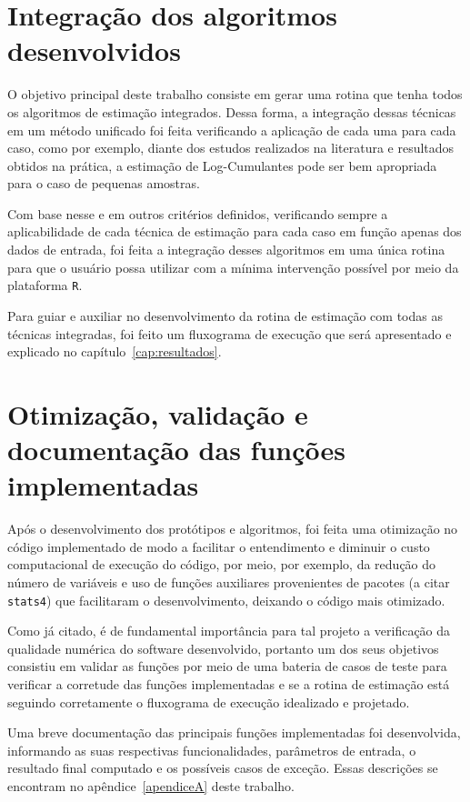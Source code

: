 \section{Integração dos algoritmos desenvolvidos}

O objetivo principal deste trabalho consiste em gerar uma rotina que tenha todos os algoritmos de estimação integrados. Dessa forma, a integração dessas técnicas em um método unificado foi feita verificando a aplicação de cada uma para cada caso, como por exemplo, diante dos estudos realizados na literatura e resultados obtidos na prática, a estimação de Log-Cumulantes pode ser bem apropriada para o caso de pequenas amostras.

Com base nesse e em outros critérios definidos, verificando sempre a aplicabilidade de cada técnica de estimação para cada caso em função apenas dos dados de entrada, foi feita a integração desses algoritmos em uma única rotina para que o usuário possa utilizar com a mínima intervenção possível por meio da plataforma \texttt{R}.

Para guiar e auxiliar no desenvolvimento da rotina de estimação com todas as técnicas integradas, foi feito um fluxograma de execução que será apresentado e explicado no capítulo~\ref{cap:resultados}.


\section{Otimização, validação e documentação das funções implementadas}

Após o desenvolvimento dos protótipos e algoritmos, foi feita uma otimização no código implementado de modo a facilitar o entendimento e diminuir o custo computacional de execução do código, por meio, por exemplo, da redução do número de variáveis e uso de funções auxiliares provenientes de pacotes (a citar \texttt{stats4}) que facilitaram o desenvolvimento, deixando o código mais otimizado.

Como já citado, é de fundamental importância para tal projeto a verificação da qualidade numérica do software desenvolvido, portanto um dos seus objetivos consistiu em validar as funções por meio de uma bateria de casos de teste para verificar a corretude das funções implementadas e se a rotina de estimação está seguindo corretamente o fluxograma de execução idealizado e projetado.

Uma breve documentação das principais funções implementadas foi desenvolvida, informando as suas respectivas funcionalidades, parâmetros de entrada, o resultado final computado e os possíveis casos de exceção. Essas descrições se encontram no apêndice~\ref{apendiceA} deste trabalho.

